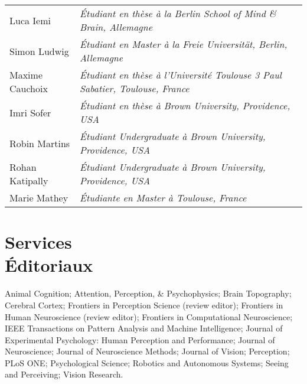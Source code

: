 \documentclass[margin,line]{resume}
\begin{document}
\begin{resume}
	\begin{tabular}{@{}ll} %
	Luca Iemi       & \textsl{\'Etudiant en thèse à la Berlin School of Mind \& Brain, Allemagne}\\
	Simon Ludwig    & \textsl{\'Etudiant en Master à la Freie Universität, Berlin, Allemagne}\\
	Maxime Cauchoix & \textsl{\'Etudiant en thèse à l'Université Toulouse 3 Paul Sabatier, Toulouse, France}\\
	Imri Sofer      & \textsl{\'Etudiant en thèse à Brown University, Providence, USA}\\
	Robin Martins   & \textsl{\'Etudiant Undergraduate à Brown University, Providence, USA} \\
	Rohan Katipally & \textsl{\'Etudiant Undergraduate à Brown University, Providence, USA} \\
	Marie Mathey    & \textsl{\'Etudiante en Master à Toulouse, France}
	\end{tabular}
	




\vspace{3mm}
\section{\mysidestyle Services\\\'Editoriaux}
Animal Cognition; 
Attention, Perception, \& Psychophysics; 
Brain Topography;  
Cerebral Cortex; 
Frontiers in Perception Science (review editor); 
Frontiers in Human Neuroscience (review editor); 
Frontiers in Computational Neuroscience; 
IEEE Transactions on Pattern Analysis and Machine Intelligence;
Journal of Experimental Psychology: Human Perception and Performance;
Journal of Neuroscience;
Journal of Neuroscience Methods;
Journal of Vision;
Perception;
PLoS ONE; 
Psychological Science;
Robotics and Autonomous Systems;
Seeing and Perceiving;
Vision Research.



\end{resume}
\end{document}
